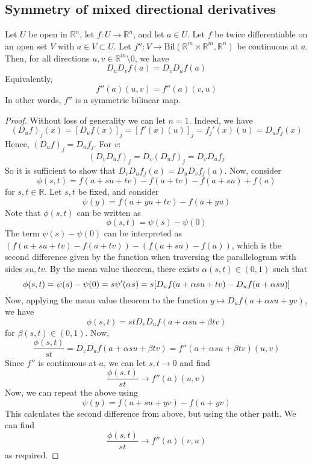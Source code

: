 \subsection{Symmetry of mixed directional derivatives}
\begin{theorem}
	Let \( U \) be open in \( \mathbb R^n \), let \( f \colon U \to \mathbb R^n \), and let \( a \in U \).
	Let \( f \) be twice differentiable on an open set \( V \) with \( a \in V \subset U \).
	Let \( f'' \colon V \to \mathrm{Bil}(\mathbb R^m \times \mathbb R^m, \mathbb R^n) \) be continuous at \( a \).
	Then, for all directions \( u,v \in \mathbb R^m \setminus \qty{0} \), we have
	\[
		D_u D_v f(a) = D_v D_u f(a)
	\]
	Equivalently,
	\[
		f''(a)(u,v) = f''(a)(v,u)
	\]
	In other words, \( f'' \) is a symmetric bilinear map.
\end{theorem}
\begin{proof}
	Without loss of generality we can let \( n = 1 \).
	Indeed, we have
	\[
		(D_u f)_j(x) = [D_u f(x)]_j = [f'(x)(u)]_j = f_j'(x)(u) = D_u f_j(x)
	\]
	Hence, \( (D_u f)_j = D_u f_j \).
	For \( v \):
	\[
		(D_v D_u f)_j = D_v (D_u f)_j = D_v D_u f_j
	\]
	So it is sufficient to show that \( D_v D_u f_j(a) = D_u D_v f_j(a) \).
	Now, consider
	\[
		\phi(s,t) = f(a+su+tv) - f(a+tv) - f(a+su) + f(a)
	\]
	for \( s, t \in \mathbb R \).
	Let \( s, t \) be fixed, and consider
	\[
		\psi(y) = f(a+yu+tv) - f(a+yu)
	\]
	Note that \( \phi(s,t) \) can be written as
	\[
		\phi(s,t) = \psi(s) - \psi(0)
	\]
	The term \( \psi(s) - \psi(0) \) can be interpreted as \( (f(a+su+tv) - f(a+tv)) - (f(a+su) - f(a)) \), which is the second difference given by the function when traversing the parallelogram with sides \( su, tv \).
	By the mean value theorem, there exists \( \alpha(s,t) \in (0,1) \) such that
	\[
		\phi(s,t) = \psi(s) - \psi(0) = s \psi'(\alpha s) = s \qty[ D_u f(a+\alpha s u+ tv) - D_u f(a + \alpha s u) ]
	\]
	Now, applying the mean value theorem to the function \( y \mapsto D_u f(a+\alpha s u + y v) \), we have
	\[
		\phi(s,t) = s t D_v D_u f (a+\alpha s u + \beta t v)
	\]
	for \( \beta(s,t) \in (0,1) \).
	Now,
	\[
		\frac{\phi(s,t)}{st} = D_v D_u f(a+\alpha su + \beta tv) = f''(a+\alpha su + \beta tv)(u,v)
	\]
	Since \( f'' \) is continuous at \( a \), we can let \( s, t \to 0 \) and find
	\[
		\frac{\phi(s,t)}{st} \to f''(a)(u,v)
	\]
	Now, we can repeat the above using
	\[
		\psi(y) = f(a+su+yv) - f(a+yv)
	\]
	This calculates the second difference from above, but using the other path.
	We can find
	\[
		\frac{\phi(s,t)}{st} \to f''(a)(v,u)
	\]
	as required.
\end{proof}

